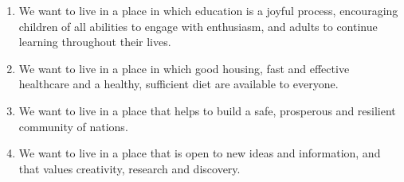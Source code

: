 \begin{enumerate}
	\item We want to live in a place in which education is a joyful process, encouraging children of all abilities to engage with enthusiasm, and adults to continue learning throughout their lives.
	\item We want to live in a place in which good housing, fast and effective healthcare and a healthy, sufficient diet are available to everyone.
	\item We want to live in a place that helps to build a safe, prosperous and resilient community of nations.
	\item We want to live in a place that is open to new ideas and information, and that values creativity, research and discovery.
\end{enumerate}

